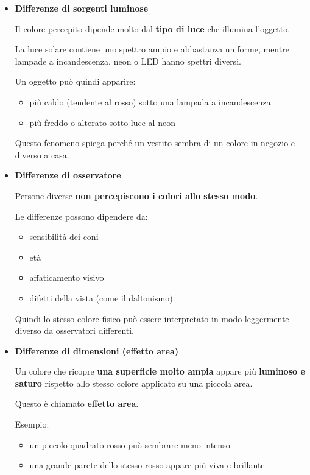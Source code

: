 \documentclass[
]{article}
\providecommand{\tightlist}{%
  \setlength{\itemsep}{0pt}\setlength{\parskip}{0pt}}
\begin{document}
\begin{itemize}
\item
  \textbf{Differenze di sorgenti luminose}

  Il colore percepito dipende molto dal \textbf{tipo di luce} che illumina l'oggetto.

  La luce solare contiene uno spettro ampio e abbastanza uniforme, mentre lampade a incandescenza, neon o LED hanno spettri diversi.

  Un oggetto può quindi apparire:

  \begin{itemize}
  \tightlist
  \item
    più caldo (tendente al rosso) sotto una lampada a incandescenza
  \item
    più freddo o alterato sotto luce al neon
  \end{itemize}

  Questo fenomeno spiega perché un vestito sembra di un colore in negozio e diverso a casa.
\item
  \textbf{Differenze di osservatore}

  Persone diverse \textbf{non percepiscono i colori allo stesso modo}.

  Le differenze possono dipendere da:

  \begin{itemize}
  \tightlist
  \item
    sensibilità dei coni
  \item
    età
  \item
    affaticamento visivo
  \item
    difetti della vista (come il daltonismo)
  \end{itemize}

  Quindi lo stesso colore fisico può essere interpretato in modo leggermente diverso da osservatori differenti.
\item
  \textbf{Differenze di dimensioni (effetto area)}

  Un colore che ricopre \textbf{una superficie molto ampia} appare più \textbf{luminoso e saturo} rispetto allo stesso colore applicato su una piccola area.

  Questo è chiamato \textbf{effetto area}.

  Esempio:

  \begin{itemize}
  \tightlist
  \item
    un piccolo quadrato rosso può sembrare meno intenso
  \item
    una grande parete dello stesso rosso appare più viva e brillante
  \end{itemize}


\end{itemize}
\end{document}
